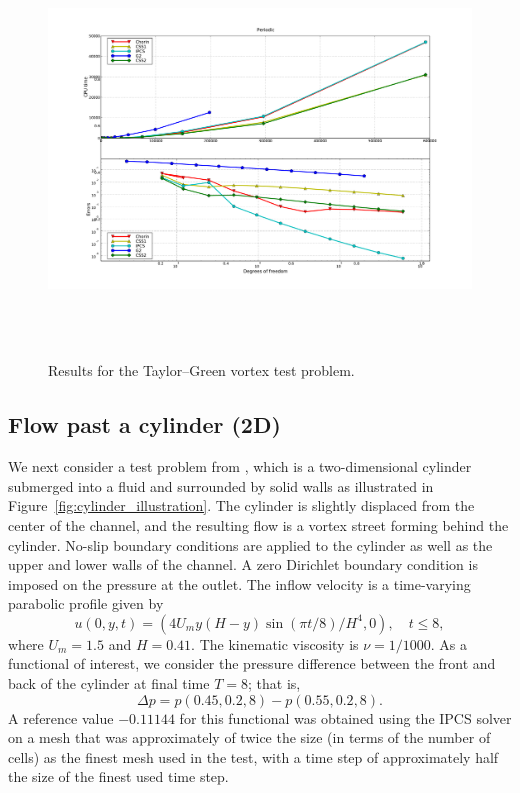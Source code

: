 \begin{figure}
  \hspace{-2cm}
  \includegraphics[width=20cm,height=11cm,keepaspectratio=false]{chapters/kvs-1/pdf/new_periodic_res.pdf}
  \caption{Results for the Taylor--Green vortex test problem.}
  \label{fig:periodic_res}
\end{figure}

\subsection{Flow past a cylinder (2D)}

We next consider a test problem from \citet{Turek1996}, which is a
two-dimensional cylinder submerged into a fluid and surrounded by
solid walls as illustrated in
Figure~\ref{fig:cylinder_illustration}. The cylinder is slightly
displaced from the center of the channel, and the resulting flow is a
vortex street forming behind the cylinder. No-slip boundary conditions
are applied to the cylinder as well as the upper and lower walls of
the channel. A zero Dirichlet boundary condition is imposed on the
pressure at the outlet. The inflow velocity is a time-varying
parabolic profile given by
\begin{equation} \label{eq:cyl_inflow}
  u(0, y, t) = (4 U_m y (H - y) \sin(\pi t/8)/H^{4}, 0), \quad t \leqslant 8,
\end{equation}
where $U_m = 1.5$ and $H = 0.41$. The kinematic viscosity is $\nu =
1/1000$. As a functional of interest, we consider the pressure
difference between the front and back of the cylinder at final time $T
= 8$; that is,
\begin{equation}\label{eq:dp}
  \Delta p = p(0.45, 0.2, 8) - p(0.55, 0.2, 8).
\end{equation}
A reference value $-0.11144$ for this functional was obtained using
the IPCS solver on a mesh that was approximately of twice the size (in
terms of the number of cells) as the finest mesh used in the test,
with a time step of approximately half the size of the finest used
time step.

